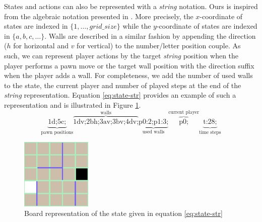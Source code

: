\documentclass[journal, a4paper]{IEEEtran}
\begin{document}
States and actions can also be represented with a \textit{string} notation. Ours is inspired from the algebraic notation presented in \cite{quoridor-wikipedia}. More precisely, the $x$-coordinate of states are indexed in $\{1, \ldots, grid\_ size\}$ while the $y$-coordinate of states are indexed in $\{a, b, c, \ldots\}$. Walls are described in a similar fashion by appending the direction ($h$ for horizontal and $v$ for vertical) to the number/letter position couple. As such, we can represent player actions by the target \textit{string} position when the player performs a pawn move or the target wall position with the direction suffix when the player adds a wall. For completeness, we add the number of used walls to the state, the current player and number of played steps at the end of the \textit{string} representation. Equation \ref{eq:state-str} provides an example of such a representation and is illustrated in Figure \ref{fig:state-str}.
\begin{equation}
    \label{eq:state-str}
    \underbrace{\text{1d;5c;}}_\text{pawn positions}\overbrace{\text{1dv;2bh;3av;3bv;4dv;}}^\text{walls}\underbrace{\text{p0:2;p1:3;}}_\text{used walls}\overbrace{\text{p0;}}^\text{current player}\underbrace{\text{t:28;}}_\text{time steps}
\end{equation}
\begin{figure}
    \centering
    \includegraphics[width=0.3\textwidth]{figures/state-str.png}
    \caption{Board representation of the state given in equation \ref{eq:state-str}}
    \label{fig:state-str}
\end{figure}
\end{document}
